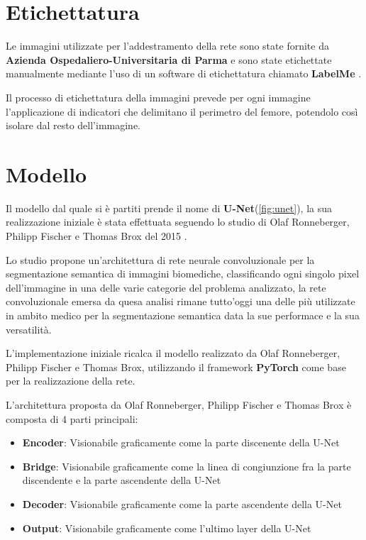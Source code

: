 \section{Etichettatura}
Le immagini utilizzate per l'addestramento della rete sono state fornite da \textbf{Azienda Ospedaliero-Universitaria di Parma} e sono state etichettate manualmente mediante
l'uso di un software di etichettatura chiamato \textbf{LabelMe} \cite{labelme}.

Il processo di etichettatura della immagini prevede per ogni immagine l'applicazione di indicatori che delimitano il perimetro del femore, potendolo così isolare dal resto dell'immagine.


\section{Modello}

Il modello dal quale si è partiti prende il nome di \textbf{U-Net}(\autoref{fig:unet}), la sua realizzazione iniziale è stata effettuata seguendo lo studio di Olaf Ronneberger, Philipp Fischer e Thomas Brox del 2015 \cite{ronneberger2015unet}.

Lo studio propone un'architettura di rete neurale convoluzionale per la segmentazione semantica di immagini biomediche, classificando ogni singolo pixel dell'immagine in una delle varie categorie del problema analizzato, la rete convoluzionale emersa da quesa analisi rimane tutto'oggi una delle più utilizzate in ambito medico per la segmentazione semantica data la sue performace e la sua versatilità.

L'implementazione iniziale ricalca il modello realizzato da Olaf Ronneberger, Philipp Fischer e Thomas Brox, utilizzando il framework \textbf{PyTorch} \cite{pytorch} come base per la realizzazione della rete.

L'architettura proposta da Olaf Ronneberger, Philipp Fischer e Thomas Brox è composta di 4 parti principali:
\begin{itemize}
  \item \textbf{Encoder}: Visionabile graficamente come la parte discenente della U-Net
  \item \textbf{Bridge}: Visionabile graficamente come la linea di congiunzione fra la parte discendente e la parte ascendente della U-Net
  \item \textbf{Decoder}: Visionabile graficamente come la parte ascendente della U-Net
  \item \textbf{Output}: Visionabile graficamente come l'ultimo layer della U-Net
\end{itemize}

